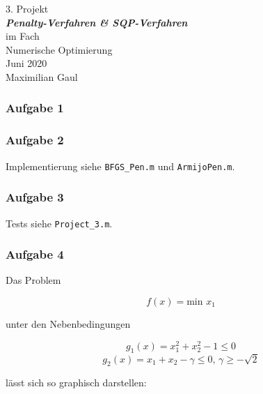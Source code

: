 \documentclass[a4paper, 12pt]{report}
\begin{document}
\begin{center}
    \vspace*{2em}
    \normalsize 3. Projekt\\
    \vspace*{1em}
    \normalsize \textbf{\textit{Penalty-Verfahren \& SQP-Verfahren}}\\
    \vspace*{4em}
    \normalsize im Fach\\
    \vspace*{1em}
    \large Numerische Optimierung\\
    \vspace*{30em}
    \normalsize Juni 2020\\
    \vspace*{1em}
    \normalsize Maximilian Gaul
\end{center}

\thispagestyle{empty}

\newpage

\subsubsection{Aufgabe 1}

\subsubsection{Aufgabe 2}
Implementierung siehe \lstinline[basicstyle=\ttfamily\color{black}]|BFGS_Pen.m| und
\lstinline[basicstyle=\ttfamily\color{black}]|ArmijoPen.m|.

\subsubsection{Aufgabe 3}
Tests siehe \lstinline[basicstyle=\ttfamily\color{black}]|Project_3.m|.

\subsubsection{Aufgabe 4}

Das Problem

$$f(x) = \text{min } x_1$$

unter den Nebenbedingungen

$$g_1(x) = x_1^2 + x_2^2 - 1 \leq 0$$
$$g_2(x) = x_1 + x_2 - \gamma \leq 0 \text{, } \gamma \geq -\sqrt{2}$$

lässt sich so graphisch darstellen:
\end{document}
